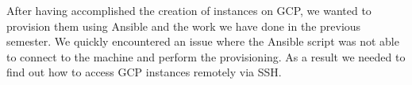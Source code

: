 After having accomplished the creation of instances on GCP, we wanted
to provision them using Ansible and the work we have done in the
previous semester. We quickly encountered an issue where the Ansible
script was not able to connect to the machine and perform the
provisioning. As a result we needed to find out how to access GCP
instances remotely via SSH.
